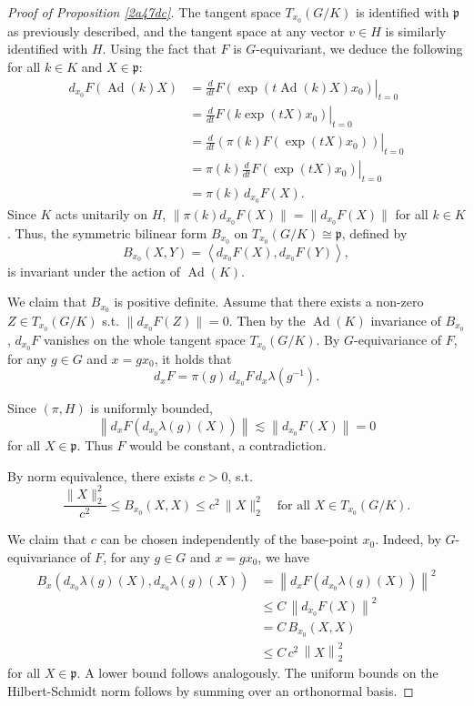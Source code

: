 \documentclass[12pt]{amsart}
\theoremstyle{definition}
\begin{document}
\begin{proof}[Proof of Proposition \ref{2a47dc}]
The tangent space \(T_{x_0}(G / K)\) is identified with \(\mathfrak{p}\)
as previously described, and the tangent space at any vector \(v \in H\)
is similarly identified with \(H\). Using the fact that \(F\) is
\(G\)-equivariant, we deduce the following for all \(k \in K\) and
\(X \in \mathfrak{p}\): \[
\begin{aligned}
d_{x_{0}} F(\operatorname{Ad}(k) X) & =\left.\frac{d}{d t} F\left(\exp(t \operatorname{Ad}(k) X) x_0\right)\right|_{t=0} \\
& =\left.\frac{d}{d t} F\left(k \exp(t X) x_0\right)\right|_{t=0} \\
& =\left.\frac{d}{d t}\left(\pi(k) F\left(\exp(t X) x_0\right)\right)\right|_{t=0} \\
& =\pi(k) \left.\frac{d}{d t} F\left(\exp(t X) x_0\right)\right|_{t=0} \\
& =\pi(k) \, d_{x_{0}} F(X).
\end{aligned}
\] Since \(K\) acts unitarily on \(H\),
\(\|\pi(k)d_{x_{0}} F(X)\| = \|d_{x_{0}} F(X)\|\) for all \(k \in K\).
Thus, the symmetric bilinear form \(B_{x_{0}}\) on
\(T_{x_0}(G / K) \cong \mathfrak{p}\), defined by \[
B_{x_{0}}(X, Y) = \left\langle d_{x_{0}} F(X), d_{x_{0}} F(Y) \right\rangle,
\] is invariant under the action of \(\operatorname{Ad}(K)\).

We claim that \(B_{x_{0}}\) is positive definite. Assume that there
exists a non-zero \(Z \in T_{x_{0}}(G/K)\) s.t.
\(\|d_{x_{0}}F(Z)\| = 0\). Then by the \(\operatorname{Ad}(K)\)
invariance of \(B_{x_{0}}\), \(d_{x_{0}}F\) vanishes on the whole
tangent space \(T_{x_{0}}(G/K)\). By \(G\)-equivariance of \(F\), for
any \(g \in G\) and \(x = g x_0\), it holds that \begin{equation}
\label{9e84cd}
d_{x} F = \pi(g) \,d_{x_{0}} F\,d_{x} \lambda\left(g^{-1}\right).\end{equation}

Since \((\pi,H)\) is uniformly bounded,
\[\left\|d_{x} F\left(d_{x_{0}} \lambda(g) (X)\right)\right\| \lesssim \left\|d_{x_{0}} F(X)\right\| = 0\]
for all \(X \in \mathfrak{p}\). Thus \(F\) would be constant, a
contradiction.

By norm equivalence, there exists \(c > 0\), s.t.
\[\frac{\|X\|_{2}^2}{c^{2}}\leq B_{x_{0}}(X,X) \leq c^{2} \,\|X\|_{2}^2 \quad \text{for all } X \in T_{x_0}(G / K).\]

We claim that \(c\) can be chosen independently of the base-point
\(x_{0}\). Indeed, by \(G\)-equivariance of \(F\), for any \(g \in G\)
and \(x = g x_0\), we have \[
\begin{aligned}
B_{x}(d_{x_{0}} \lambda(g) (X),d_{x_{0}} \lambda(g) (X) )
&=\left\|d_{x} F\left(d_{x_{0}} \lambda(g) (X)\right)\right\|^{2} \\
& \leq C \, \left\|d_{x_{0}} F(X)\right\|^{2} \\
& = C \, B_{x_{0}}(X,X) \\
& \leq C\,c^{2} \, \left\|X\right\|_2^{2}
\end{aligned}
\] for all \(X \in \mathfrak{p}\). A lower bound follows analogously.
The uniform bounds on the Hilbert-Schmidt norm follows by summing over
an orthonormal basis.


\end{proof}
\end{document}
